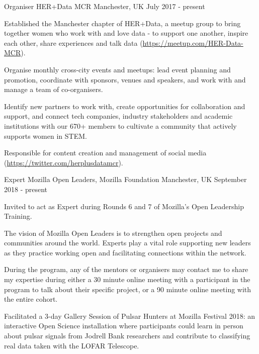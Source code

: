 \begin{cventries}
\cventry
    {Organiser}
    {HER+Data MCR}
    {Manchester, UK}
    {July 2017 - present}
    {
      \begin{cvitems}
        \item {Established the Manchester chapter of HER+Data, a meetup group to bring together women who work with and love data - to support one another, inspire each other, share experiences and talk data (\url{https://meetup.com/HER-Data-MCR}).}
        \item {Organise monthly cross-city events and meetups: lead event planning and promotion, coordinate with sponsors, venues and speakers, and work with and manage a team of co-organisers.}
        \item {Identify new partners to work with, create opportunities for collaboration and support, and connect tech companies, industry stakeholders and academic institutions with our 670+ members to cultivate a community that actively supports women in STEM.}
        \item {Responsible for content creation and management of social media (\url{https://twitter.com/herplusdatamcr}).}
      \end{cvitems}
    }
\cventry
    {Expert}
    {Mozilla Open Leaders, Mozilla Foundation}
    {Manchester, UK}
    {September 2018 - present}
    {
      \begin{cvitems}
        \item{Invited to act as Expert during Rounds 6 and 7 of Mozilla's Open Leadership Training.}
        \item{The vision of Mozilla Open Leaders is to strengthen open projects and communities around the world. Experts play a vital role supporting new leaders as they practice working open and facilitating connections within the network.}
        \item{During the program, any of the mentors or organisers may contact me to share my expertise during either a 30 minute online meeting with a participant in the program to talk about their specific project, or a 90 minute online meeting with the entire cohort.}
        \item {Facilitated a 3-day Gallery Session of Pulsar Hunters at Mozilla Festival 2018: an interactive Open Science installation where participants could learn in person about pulsar signals from Jodrell Bank researchers and contribute to classifying real data taken with the LOFAR Telescope.}
      \end{cvitems}
}
\end{cventries}
